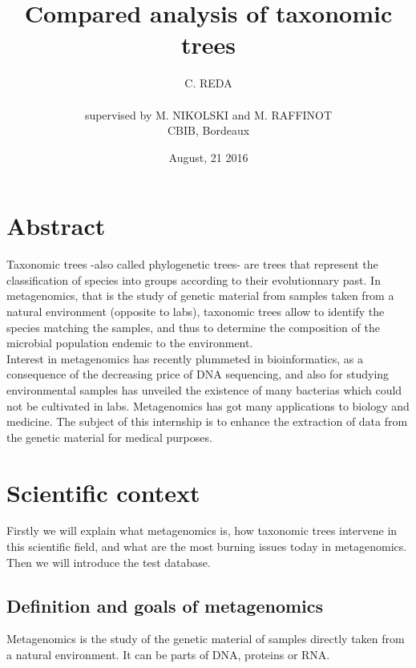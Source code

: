 \documentclass{report}
\title{Compared analysis of taxonomic trees}
\author{C. REDA \\ \\ supervised by M. NIKOLSKI and M. RAFFINOT\\CBIB, Bordeaux}
\date{August, 21 2016}
\begin{document}
\maketitle

\chapter*{Abstract}
\nocite{*}
Taxonomic trees -also called phylogenetic trees- are trees that represent the classification of species into groups according to their evolutionnary past. In metagenomics, that is the study of genetic material from samples taken from a natural environment (opposite to labs), taxonomic trees allow to identify the species matching the samples, and thus to determine the composition of the microbial population endemic to the environment.\\

Interest in metagenomics has recently plummeted in bioinformatics, as a consequence of the decreasing price of DNA sequencing, and also for studying environmental samples has unveiled the existence of many bacterias which could not be cultivated in labs. Metagenomics has got many applications to biology and medicine. The subject of this internship is to enhance the extraction of data from the genetic material for medical purposes.\\

\newpage
 
\tableofcontents
 
\newpage

\listoffigures

\newpage

\listoftables

\newpage
 

\chapter{Scientific context}

Firstly we will explain what metagenomics is, how taxonomic trees intervene in this scientific field, and what are the most burning issues today in metagenomics. Then we will introduce the test database.

\section{Definition and goals of metagenomics}
Metagenomics is the study of the genetic material of samples directly taken from a natural environment. It can be parts of DNA, proteins or RNA.\\
\end{document}
